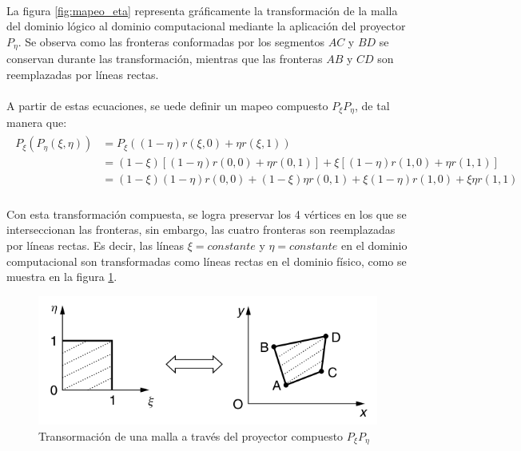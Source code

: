 \documentclass[letterpaper, openright, 12pt]{book}
\begin{document}
			\paragraph*{}
				La figura \ref{fig:mapeo_eta} representa gráficamente la transformación de la malla del dominio lógico al dominio computacional mediante la aplicación del proyector $P_{\eta}$. Se observa como las fronteras conformadas por los segmentos $AC$ y $BD$ se conservan durante las transformación, mientras que las fronteras $AB$ y $CD$ son reemplazadas por líneas rectas.
			\paragraph*{}
				A partir de estas ecuaciones, se uede definir un mapeo compuesto $P_{\xi}P_{\eta}$, de tal manera que:
				\begin{align}
					\begin{aligned}
						P_{\xi}(P_{\eta}(\xi, \eta)) &= P_{\xi} ((1 - \eta)r(\xi, 0) + \eta r(\xi, 1)) \\
						&= (1 - \xi) \left[ (1 - \eta)r(0, 0) + \eta r(0, 1) \right] + \xi \left[ (1 - \eta)r(1, 0) + \eta r(1,1) \right]\\
						&= (1 - \xi)(1 - \eta)r(0, 0) + (1-\xi)\eta r(0, 1) + \xi(1 - \eta)r(1, 0) + \xi\eta r(1, 1)
					\end{aligned}
				\end{align}
			\paragraph*{}
				Con esta transformación compuesta, se logra preservar los 4 vértices en los que se interseccionan las fronteras, sin embargo, las cuatro fronteras son reemplazadas por líneas rectas. Es decir, las líneas $\xi = constante$ y $\eta = constante$ en el dominio computacional son transformadas como líneas rectas en el dominio físico, como se muestra en la figura \ref{fig:mapeo_xieta}.
			\begin{figure}[htbp!]
				\centering
				\includegraphics[width=120mm]{./Imagenes/mapeo_xieta}
				\caption[Transformación de malla por $P_{\xi}P_{\eta}$]{Transormación de una malla a través del proyector compuesto $P_{\xi}P_{\eta}$ \cite{farrashkhalvat}}
				\label{fig:mapeo_xieta}
			\end{figure}
			
\end{document}
